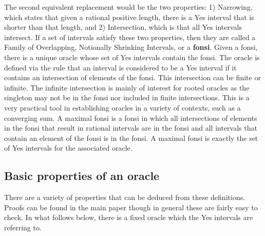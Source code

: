 \documentclass[12pt]{article}
\begin{document}
The second equivalent replacement would be the two properties: 1) Narrowing, which states that given a rational positive length, there is a Yes interval that is shorter than that length, and 2) Intersection, which is that all Yes intervals intersect. If a set of intervals satisfy these two properties, then they are called a Family of Overlapping, Notionally Shrinking Intervals, or a \textbf{fonsi}. Given a fonsi, there is a unique oracle whose set of Yes intervals contain the fonsi. The oracle is defined via the rule that an interval is considered to be a Yes interval if it contains an intersection of elements of the fonsi. This intersection can be finite or infinite. The infinite intersection is mainly of interest for rooted oracles as the singleton may not be in the fonsi nor included in finite intersections. This is a very practical tool in establishing oracles in a variety of contexts, such as a converging sum. A maximal fonsi is a fonsi in which all intersections of elements in the fonsi that result in rational intervals are in the fonsi and all intervals that contain an element of the fonsi is in the fonsi. A maximal fonsi is exactly the set of Yes intervals for the associated oracle. 


\subsection{Basic properties of an oracle}

There are a variety of properties that can be deduced from these definitions. Proofs can be found in the main paper though in general these are fairly easy to check. In what follows below, there is a fixed oracle which the Yes intervals are referring to.
\end{document}
